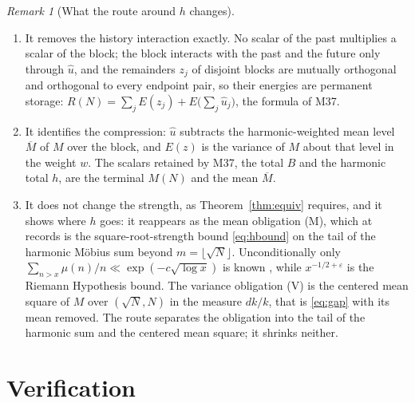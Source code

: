 \documentclass[11pt]{article}
\theoremstyle{definition}
\theoremstyle{remark}
\newtheorem{remark}[theorem]{Remark}
\begin{document}
\begin{remark}[What the route around $h$ changes]\label{rem:aroundh}
\begin{enumerate}
\item[(a)] It removes the history interaction exactly. No scalar of the past multiplies a scalar of the block; the block interacts with the past and the future only through $\hat u$, and the remainders $z_j$ of disjoint blocks are mutually orthogonal and orthogonal to every endpoint pair, so their energies are permanent storage: $R(N)=\sum_jE(z_j)+E\big(\sum_j\hat u_j\big)$, the formula of M37.
\item[(b)] It identifies the compression: $\hat u$ subtracts the harmonic-weighted mean level $\overline M$ of $M$ over the block, and $E(z)$ is the variance of $M$ about that level in the weight $w$. The scalars retained by M37, the total $B$ and the harmonic total $h$, are the terminal $M(N)$ and the mean $\overline M$.
\item[(c)] It does not change the strength, as Theorem~\ref{thm:equiv} requires, and it shows where $h$ goes: it reappears as the mean obligation (M), which at records is the square-root-strength bound \eqref{eq:hbound} on the tail of the harmonic M\"obius sum beyond $m=\lfloor\sqrt N\rfloor$. Unconditionally only $\sum_{n>x}\mu(n)/n\ll\exp(-c\sqrt{\log x})$ is known \cite[Ch.~12]{ivic}, while $x^{-1/2+\varepsilon}$ is the Riemann Hypothesis bound. The variance obligation (V) is the centered mean square of $M$ over $(\sqrt N,N)$ in the measure $dk/k$, that is \eqref{eq:gap} with its mean removed. The route separates the obligation into the tail of the harmonic sum and the centered mean square; it shrinks neither.
\end{enumerate}
\end{remark}

\section{Verification}\label{sec:verification}
\end{document}
